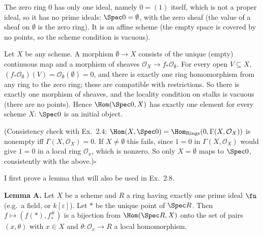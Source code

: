 \documentclass[11pt]{article}
\begin{document}
\pf
The zero ring $0$ has only one ideal, namely $0=(1)$ itself, which is not a proper ideal, so it has no prime ideals: $\Spec 0=\emptyset$, with the zero sheaf (the value of a sheaf on $\emptyset$ is the zero ring). It is an affine scheme (the empty space is covered by no points, so the scheme condition is vacuous).

Let $X$ be any scheme. A morphism $\emptyset\to X$ consists of the unique (empty) continuous map and a morphism of sheaves $\mathcal O_X\to f_*\mathcal O_\emptyset$. For every open $V\subseteq X$, $(f_*\mathcal O_\emptyset)(V)=\mathcal O_\emptyset(\emptyset)=0$, and there is exactly one ring homomorphism from any ring to the zero ring; these are compatible with restrictions. So there is exactly one morphism of sheaves, and the locality condition on stalks is vacuous (there are no points). Hence $\Hom(\Spec0,X)$ has exactly one element for every scheme $X$: $\Spec 0$ is an initial object.

(Consistency check with Ex.~2.4: $\Hom(X,\Spec 0)=\Hom_{\mathrm{Rings}}(0,\Gamma(X,\mathcal O_X))$ is nonempty iff $\Gamma(X,\mathcal O_X)=0$. If $X\ne\emptyset$ this fails, since $1=0$ in $\Gamma(X,\mathcal O_X)$ would give $1=0$ in a local ring $\mathcal O_x$, which is nonzero. So only $X=\emptyset$ maps to $\Spec 0$, consistently with the above.)\hfill$\square$

\pf
I first prove a lemma that will also be used in Ex.~2.8.

\textbf{Lemma A.} Let $X$ be a scheme and $R$ a ring having exactly one prime ideal $\fn$ (e.g.\ a field, or $k[\varepsilon]$). Let $*$ be the unique point of $\Spec R$. Then $f\mapsto(f(*),f^\#_*)$ is a bijection from $\Hom(\Spec R,X)$ onto the set of pairs $(x,\theta)$ with $x\in X$ and $\theta:\mathcal O_x\to R$ a local homomorphism.
\end{document}
